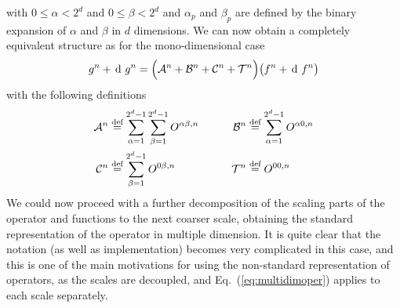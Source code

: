 with $0 \leq \alpha < 2^d$ and $0 \leq \beta < 2^d$ and $\alpha_p$ and $\beta_p$
are defined by the binary expansion of $\alpha$ and $\beta$ in $d$ dimensions.
We can now obtain a completely equivalent structure as for the mono-dimensional
case
\begin{equation}
    \label{eq:multidimoper}
    \scalingrep{g}{n} + \waveletrep{g}{n} = 
	\Big(\mathcal{A}^n + \mathcal{B}^n + \mathcal{C}^n + \mathcal{T}^n\Big)
	\big(\scalingrep{f}{n} + \waveletrep{f}{n}\big)
\end{equation} 
with the following definitions
\begin{eqnarray}
    \begin{split}
	\mathcal{A}^{n} &\stackrel{\text{def}}{\hbox{=}} 
        \sum_{\alpha=1}^{2^d-1} \sum_{\beta=1}^{2^d-1} O^{\alpha\beta,n} \qquad
	&\mathcal{B}^{n} &\stackrel{\text{def}}{\hbox{=}} 
	\sum_{\alpha=1}^{2^d-1} O^{\alpha 0,n} \\
	\mathcal{C}^{n} &\stackrel{\text{def}}{\hbox{=}} 
	\sum_{\beta=1}^{2^d-1} O^{0 \beta,n}
	&\mathcal{T}^{n} &\stackrel{\text{def}}{\hbox{=}} O^{00,n}
    \end{split}
\end{eqnarray}
We could now proceed with a further decomposition of the scaling parts of the
operator and functions to the next coarser scale, obtaining the standard
representation of the operator in multiple dimension. It is quite clear that the 
notation (as well as implementation) becomes very complicated in this case, and this
is one of the main motivations for using the non-standard representation of operators,
as the scales are decoupled, and Eq.~(\ref{eq:multidimoper}) applies to each scale
separately.

